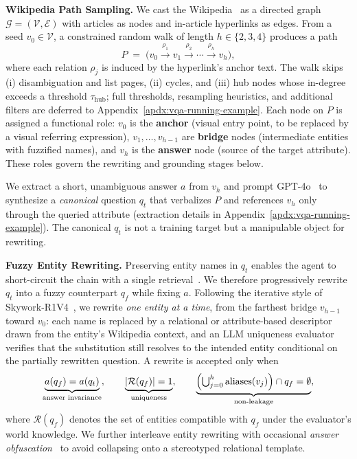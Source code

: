 \textbf{Wikipedia Path Sampling.}
We cast the Wikipedia~\citep{wikipedia} as a directed graph $\mathcal{G}=(\mathcal{V},\mathcal{E})$ with articles as nodes and in-article hyperlinks as edges. From a seed $v_0\in\mathcal{V}$, a constrained random walk of length $h\in\{2,3,4\}$ produces a path
\begin{equation}
  P \;=\; \bigl(v_0 \xrightarrow{\rho_1} v_1 \xrightarrow{\rho_2} \cdots \xrightarrow{\rho_h} v_h\bigr),
  \label{eq:wiki-path}
\end{equation}
where each relation $\rho_j$ is induced by the hyperlink's anchor text. The walk skips (i) disambiguation and list pages, (ii) cycles, and (iii) hub nodes whose in-degree exceeds a threshold $\tau_\text{hub}$; full thresholds, resampling heuristics, and additional filters are deferred to Appendix~\ref{apdx:vqa-running-example}. Each node on $P$ is assigned a functional role: $v_0$ is the \textbf{anchor} (visual entry point, to be replaced by a visual referring expression), $v_1,\dots,v_{h-1}$ are \textbf{bridge} nodes (intermediate entities with fuzzified names), and $v_h$ is the \textbf{answer} node (source of the target attribute). These roles govern the rewriting and grounding stages below.


We extract a short, unambiguous answer $a$ from $v_h$ and prompt GPT-4o~\citep{openai2024gpt4ocard} to synthesize a \emph{canonical} question $q_t$ that verbalizes $P$ and references $v_h$ only through the queried attribute (extraction details in Appendix~\ref{apdx:vqa-running-example}). The canonical $q_t$ is not a training target but a manipulable object for rewriting.

\textbf{Fuzzy Entity Rewriting.}
Preserving entity names in $q_t$ enables the agent to short-circuit the chain with a single retrieval~\citep{li2025websailor,huang2026vision}. We therefore progressively rewrite $q_t$ into a fuzzy counterpart $q_f$ while fixing $a$. Following the iterative style of Skywork-R1V4~\citep{zhang2025skywork}, we rewrite \emph{one entity at a time}, from the farthest bridge $v_{h-1}$ toward $v_0$: each name is replaced by a relational or attribute-based descriptor drawn from the entity's Wikipedia context, and an LLM uniqueness evaluator verifies that the substitution still resolves to the intended entity conditional on the partially rewritten question. A rewrite is accepted only when
\begin{equation}
\underbrace{a(q_f)=a(q_t)}_{\text{answer invariance}},\qquad
\underbrace{\lvert\mathcal{R}(q_f)\rvert=1}_{\text{uniqueness}},\qquad
\underbrace{\Bigl(\textstyle\bigcup_{j=0}^{h}\mathrm{aliases}(v_j)\Bigr)\cap q_f = \emptyset}_{\text{non-leakage}},
\label{eq:fuzz-invariants}
\end{equation}
where $\mathcal{R}(q_f)$ denotes the set of entities compatible with $q_f$ under the evaluator's world knowledge. We further interleave entity rewriting with occasional \emph{answer obfuscation}~\citep{huang2026vision} to avoid collapsing onto a stereotyped relational template.

